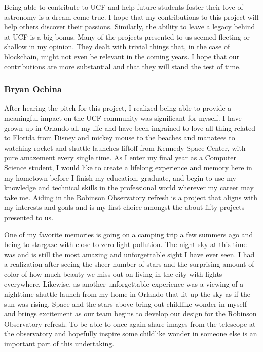 \documentclass[12pt]{article}
\begin{document}
Being able to contribute to UCF and help future students foster their love of astronomy is a dream come true. I hope that my contributions to this project will help others discover their passions. Similarly, the ability to leave a legacy behind at UCF is a big bonus. Many of the projects presented to us seemed fleeting or shallow in my opinion. They dealt with trivial things that, in the case of blockchain, might not even be relevant in the coming years. I hope that our contributions are more substantial and that they will stand the test of time.

\subsubsection{Bryan Ocbina}

After hearing the pitch for this project, I realized being able to provide a meaningful impact on the UCF community was significant for myself.  I have grown up in Orlando all my life and have been ingrained to love all thing related to Florida from Disney and mickey mouse to the beaches and manatees to watching rocket and shuttle launches liftoff from Kennedy Space Center, with pure amazement every single time.  As I enter my final year as a Computer Science student, I would like to create a lifelong experience and memory here in my hometown before I finish my education, graduate, and begin to use my knowledge and technical skills in the professional world wherever my career may take me.  Aiding in the Robinson Observatory refresh is a project that aligns with my interests and goals and is my first choice amongst the about fifty projects presented to us.

One of my favorite memories is going on a camping trip a few summers ago and being to stargaze with close to zero light pollution.  The night sky at this time was and is still the most amazing and unforgettable sight I have ever seen.  I had a realization after seeing the sheer number of stars and the surprising amount of color of how much beauty we miss out on living in the city with lights everywhere.  Likewise, as another unforgettable experience was a viewing of a nighttime shuttle launch from my home in Orlando that lit up the sky as if the sun was rising.  Space and the stars above bring out childlike wonder in myself and brings excitement as our team begins to develop our design for the Robinson Observatory refresh.  To be able to once again share images from the telescope at the observatory and hopefully inspire some childlike wonder in someone else is an important part of this undertaking.
\end{document}
